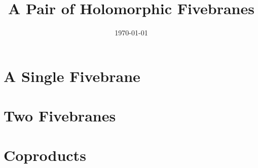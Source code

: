 \documentclass{amsart}
\begin{document}
\title{A Pair of Holomorphic Fivebranes}


\date{\today}
\maketitle


\section{A Single Fivebrane}




\section{Two Fivebranes}




\section{Coproducts}
\end{document}
